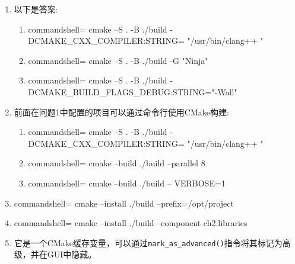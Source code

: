 

\begin{enumerate}
\item 
以下是答案:
\begin{enumerate}[label=\Alph*]
\item 

\begin{tcblisting}{commandshell={}}
cmake –S . -B ./build -DCMAKE_CXX_COMPILER:STRING=
"/usr/bin/clang++ "
\end{tcblisting}

\item

\begin{tcblisting}{commandshell={}}
cmake –S . -B ./build -G "Ninja"
\end{tcblisting}

\item 

\begin{tcblisting}{commandshell={}}
cmake –S . -B ./build 
-DCMAKE_BUILD_FLAGS_DEBUG:STRING="-Wall"
\end{tcblisting}
\end{enumerate}

\item 
前面在问题1中配置的项目可以通过命令行使用CMake构建:

\begin{enumerate}[label=\Alph*]
\item 
\begin{tcblisting}{commandshell={}}
cmake –S . -B ./build 
-DCMAKE_CXX_COMPILER:STRING= "/usr/bin/clang++ "
\end{tcblisting}

\item

\begin{tcblisting}{commandshell={}}
cmake --build ./build --parallel 8
\end{tcblisting}

\item 

\begin{tcblisting}{commandshell={}}
cmake --build ./build -- VERBOSE=1
\end{tcblisting}
\end{enumerate}

\item 
\begin{tcblisting}{commandshell={}}
cmake --install ./build --prefix=/opt/project
\end{tcblisting}

\item 
\begin{tcblisting}{commandshell={}}
cmake --install ./build --component ch2.libraries
\end{tcblisting}

\item 
它是一个CMake缓存变量，可以通过\texttt{mark\_as\_advanced()}指令将其标记为高级，并在GUI中隐藏。
\end{enumerate}